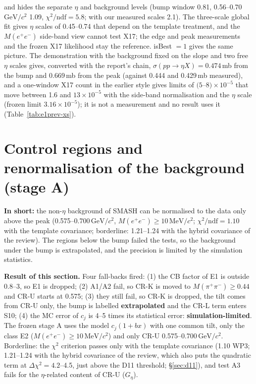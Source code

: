 \documentclass[11pt,a4paper]{article}
\newcommand{\Mee}{\ensuremath{M(e^{+}e^{-})}\xspace}
\newcommand{\Mpipi}{\ensuremath{M(\pi^{+}\pi^{-})}\xspace}
\newcommand{\GeVcc}{\ensuremath{\mathrm{GeV}/c^{2}}\xspace}
\newcommand{\MeVcc}{\ensuremath{\mathrm{MeV}/c^{2}}\xspace}
\newcommand{\sigeta}{\ensuremath{\sigma(pp\to\eta X)}\xspace}
\newcommand{\Geta}{\ensuremath{G_\eta}\xspace}
\newcommand{\notebox}[1]{\par\noindent\colorbox{orange!10}{\parbox{\dimexpr\linewidth-2\fboxsep\relax}{#1}}\par}
\newcommand{\tipbox}[1]{\par\noindent\colorbox{blue!6}{\parbox{\dimexpr\linewidth-2\fboxsep\relax}{#1}}\par}
\newcommand{\inshort}[1]{\tipbox{\textbf{In short:} #1}}%
\begin{document}
\begin{enumerate}
      and hides the separate $\eta$ and background levels (bump window 0.81, 0.56--0.70\,\GeVcc 1.09, $\chi^2/\mathrm{ndf}=5.8$; with our measured
      scales 2.1). The three-scale global fit gives $\eta$ scales of 0.45--0.74 that depend on the template treatment, and the \Mee side-band view
      cannot test X17; the edge and peak measurements and the frozen X17 likelihood stay the reference. isBest $=1$ gives the same picture.
      The demonstration with the background fixed on the slope and two free $\eta$ scales gives, converted with the report's chain,
      \sigeta$=0.474$\,mb from the bump and 0.669\,mb from the peak (against 0.444 and 0.429\,mb measured), and a one-window X17 count in the
      earlier style gives limits of $(5$--$8)\times10^{-5}$ that move between 1.6 and $13\times10^{-5}$ with the side-band normalisation and
      the $\eta$ scale (frozen limit $3.16\times10^{-5}$); it is not a measurement and no result uses it (Table~\ref{tab:e1prev-xs}).
\end{enumerate}

\section{Control regions and renormalisation of the background (stage A)}
\label{sec:cr}
\inshort{the non-$\eta$ background of SMASH can be normalised to the data only above the peak (0.575--0.700\,\GeVcc, \Mee$\ge10$\,\MeVcc; $\chi^2/\mathrm{ndf}=1.10$ with the template covariance; borderline: 1.21--1.24 with the hybrid covariance of the review). The regions below the bump failed the tests, so the background under the bump is extrapolated, and the precision is limited by the simulation statistics.}
\notebox{\textbf{Result of this section.} Four fall-backs fired: (1) the CB factor of E1 is outside 0.8--3, so E1 is dropped; (2) A1/A2
fail, so CR-K is moved to \Mpipi$\ge0.44$ and CR-U starts at 0.575; (3) they still fail, so CR-K is dropped, the tilt comes from CR-U
only, the bump is labelled \textbf{extrapolated} and the CR-L term enters S10; (4) the MC error of $c_j$ is 4--5 times its statistical error:
\textbf{simulation-limited}. The frozen stage A uses the model $c_j(1+bx)$ with one common tilt, only the class E2 (\Mee$\ge10$\,\MeVcc)
and only CR-U 0.575--0.700\,\GeVcc. Borderline: the $\chi^2$ criterion passes only with the template covariance (1.10 WP3; 1.21--1.24
with the hybrid covariance of the review, which also puts the quadratic term at $\Delta\chi^2=4.2$--4.5, just above the D11 threshold;
\S\ref{sec:d11}), and test A3 fails for the $\eta$-related content of CR-U (\Geta).}
\end{document}
